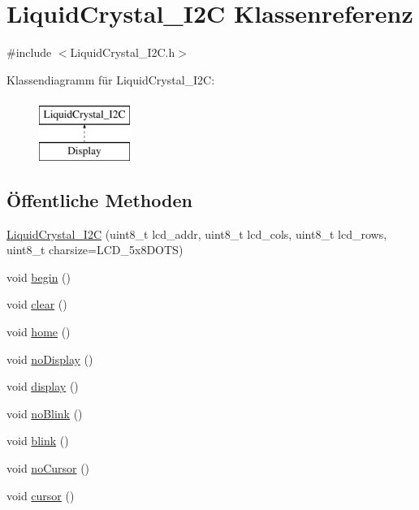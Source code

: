 \hypertarget{classLiquidCrystal__I2C}{}\section{Liquid\+Crystal\+\_\+\+I2C Klassenreferenz}
\label{classLiquidCrystal__I2C}


{\ttfamily \#include $<$Liquid\+Crystal\+\_\+\+I2\+C.\+h$>$}

Klassendiagramm für Liquid\+Crystal\+\_\+\+I2C\+:\begin{figure}[H]
\begin{center}
\leavevmode
\includegraphics[height=2.000000cm]{classLiquidCrystal__I2C}
\end{center}
\end{figure}
\subsection*{Öffentliche Methoden}
\begin{DoxyCompactItemize}
\item 
\hyperlink{classLiquidCrystal__I2C_a52ea9b51b4adaddbf05760ff595ffcc2}{Liquid\+Crystal\+\_\+\+I2C} (uint8\+\_\+t lcd\+\_\+addr, uint8\+\_\+t lcd\+\_\+cols, uint8\+\_\+t lcd\+\_\+rows, uint8\+\_\+t charsize=L\+C\+D\+\_\+5x8\+D\+O\+TS)
\item 
void \hyperlink{classLiquidCrystal__I2C_a62235d63b74abf26160d7cfe67a9687e}{begin} ()
\item 
void \hyperlink{classLiquidCrystal__I2C_ab47996231da6feeebcebf0e6e34756a9}{clear} ()
\item 
void \hyperlink{classLiquidCrystal__I2C_a9b8edf82c5835c9b6caac98b5a0ed464}{home} ()
\item 
void \hyperlink{classLiquidCrystal__I2C_af89d6facccc156d7f151da71ecdd3b70}{no\+Display} ()
\item 
void \hyperlink{classLiquidCrystal__I2C_a5fa41920b5cebf1960b15582a957eb93}{display} ()
\item 
void \hyperlink{classLiquidCrystal__I2C_a89ba791c60f6100eb565bc6099e56bb1}{no\+Blink} ()
\item 
void \hyperlink{classLiquidCrystal__I2C_a604ade489e878ec757a05dab4586c3a9}{blink} ()
\item 
void \hyperlink{classLiquidCrystal__I2C_a35a18278aa45bd91f2772924a50b7120}{no\+Cursor} ()
\item 
void \hyperlink{classLiquidCrystal__I2C_a4ea81707534586397b00c39b1ab236bf}{cursor} ()
\end{DoxyCompactItemize}


